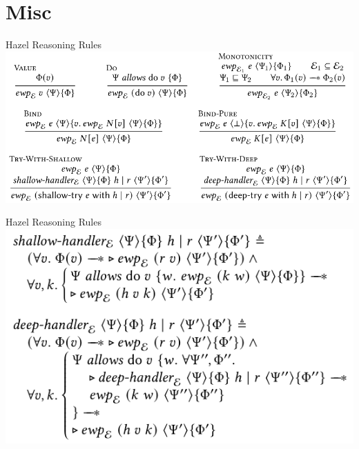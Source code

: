 \documentclass[aspectratio=43]{beamer}
\begin{document}
\section{Misc}



\begin{frame}{Hazel Reasoning Rules}
    \includegraphics[width=\textwidth]{reasoning_rules1.png}
\end{frame}

\begin{frame}{Hazel Reasoning Rules}
    \includegraphics[width=\textwidth]{reasoning_rules2.png}
\end{frame}
\end{document}

